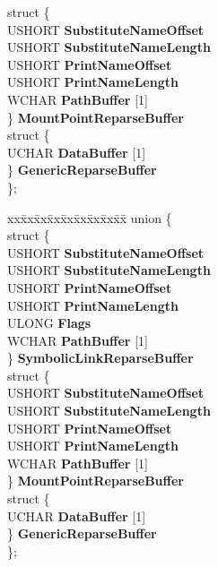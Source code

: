 \begin{DoxyCompactItemize}
\begin{tabbing}
\>struct \{\\
\>\>USHORT {\bfseries SubstituteNameOffset}\\
\>\>USHORT {\bfseries SubstituteNameLength}\\
\>\>USHORT {\bfseries PrintNameOffset}\\
\>\>USHORT {\bfseries PrintNameLength}\\
\>\>WCHAR {\bfseries PathBuffer} \mbox{[}1\mbox{]}\\
\>\} {\bfseries MountPointReparseBuffer}\\
\>struct \{\\
\>\>UCHAR {\bfseries DataBuffer} \mbox{[}1\mbox{]}\\
\>\} {\bfseries GenericReparseBuffer}\\
\}; \\

\end{tabbing}\item 
\mbox{\label{struct___r_e_p_a_r_s_e___d_a_t_a___b_u_f_f_e_r_a147503590f71e7c7810a94477a3da674}} 
\begin{tabbing}
xx\=xx\=xx\=xx\=xx\=xx\=xx\=xx\=xx\=\kill
union \{\\
\>struct \{\\
\>\>USHORT {\bfseries SubstituteNameOffset}\\
\>\>USHORT {\bfseries SubstituteNameLength}\\
\>\>USHORT {\bfseries PrintNameOffset}\\
\>\>USHORT {\bfseries PrintNameLength}\\
\>\>ULONG {\bfseries Flags}\\
\>\>WCHAR {\bfseries PathBuffer} \mbox{[}1\mbox{]}\\
\>\} {\bfseries SymbolicLinkReparseBuffer}\\
\>struct \{\\
\>\>USHORT {\bfseries SubstituteNameOffset}\\
\>\>USHORT {\bfseries SubstituteNameLength}\\
\>\>USHORT {\bfseries PrintNameOffset}\\
\>\>USHORT {\bfseries PrintNameLength}\\
\>\>WCHAR {\bfseries PathBuffer} \mbox{[}1\mbox{]}\\
\>\} {\bfseries MountPointReparseBuffer}\\
\>struct \{\\
\>\>UCHAR {\bfseries DataBuffer} \mbox{[}1\mbox{]}\\
\>\} {\bfseries GenericReparseBuffer}\\
\}; \\


\end{tabbing}
\end{DoxyCompactItemize}
